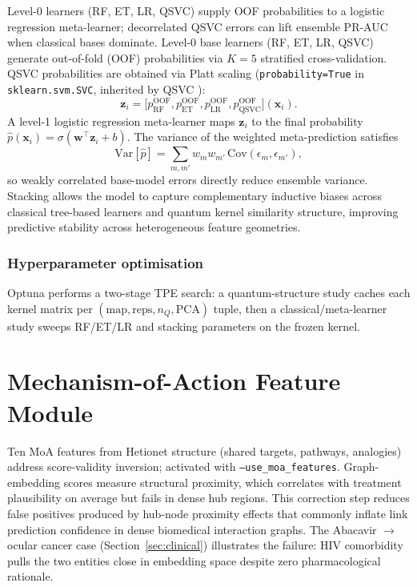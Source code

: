 \ifqceshort
Level-0 learners (RF, ET, LR, QSVC) supply OOF probabilities to a logistic
regression meta-learner; decorrelated QSVC errors can lift ensemble PR-AUC
when classical bases dominate.
\else
Level-0 base learners (RF, ET, LR, QSVC) generate out-of-fold (OOF) probabilities
via $K=5$ stratified cross-validation. QSVC probabilities are obtained via
Platt scaling \cite{platt1999} (\texttt{probability=True} in \texttt{sklearn.svm.SVC},
inherited by QSVC \cite{qiskit_ml2023}):
\begin{equation}
\mathbf{z}_i=\bigl[p_\mathrm{RF}^\mathrm{OOF},p_\mathrm{ET}^\mathrm{OOF},
p_\mathrm{LR}^\mathrm{OOF},p_\mathrm{QSVC}^\mathrm{OOF}\bigr](\mathbf{x}_i).
\label{eq:stack}
\end{equation}
A level-1 logistic regression meta-learner maps $\mathbf{z}_i$ to the final
probability $\hat{p}(\mathbf{x}_i)=\sigma(\mathbf{w}^\top\mathbf{z}_i+b)$.
The variance of the weighted meta-prediction satisfies
\begin{equation}
\mathrm{Var}[\hat{p}]=\sum_{m,m'}w_m w_{m'}\,\mathrm{Cov}(\epsilon_m,\epsilon_{m'}),
\label{eq:ensemble_var}
\end{equation}
so weakly correlated base-model errors directly reduce ensemble variance.
Stacking allows the model to capture complementary inductive biases across
classical tree-based learners and quantum kernel similarity structure,
improving predictive stability across heterogeneous feature geometries.
\fi

\ifqceshort\else
\subsubsection*{Hyperparameter optimisation}
Optuna \cite{optuna2019} performs a two-stage TPE search: a quantum-structure
study caches each kernel matrix per $(\mathrm{map},\mathrm{reps},n_Q,\mathrm{PCA})$
tuple, then a classical/meta-learner study sweeps RF/ET/LR and stacking
parameters on the frozen kernel.
\fi

\section{Mechanism-of-Action Feature Module}
\label{sec:moa}

\ifqceshort
Ten MoA features from Hetionet structure (shared targets, pathways, analogies)
address score-validity inversion; activated with \texttt{--use\_moa\_features}.
\else
Graph-embedding scores measure structural proximity, which correlates with
treatment plausibility on average but fails in dense hub regions.
This correction step reduces false positives produced by hub-node proximity
effects that commonly inflate link prediction confidence in dense biomedical
interaction graphs.
The Abacavir $\to$ ocular cancer case (Section~\ref{sec:clinical}) illustrates
the failure: HIV comorbidity pulls the two entities close in embedding space
despite zero pharmacological rationale.


